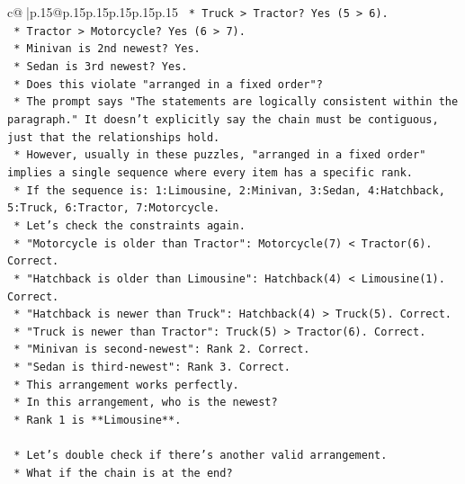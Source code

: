 \documentclass{article}
\begin{document}
{\begin{supertabular}{c@{$\;$}|p{.15\linewidth}@{}p{.15\linewidth}p{.15\linewidth}p{.15\linewidth}p{.15\linewidth}p{.15\linewidth}}
{{{\texttt{                *   Truck > Tractor? Yes (5 > 6).} \\
\texttt{                *   Tractor > Motorcycle? Yes (6 > 7).} \\
\texttt{                *   Minivan is 2nd newest? Yes.} \\
\texttt{                *   Sedan is 3rd newest? Yes.} \\
\texttt{            *   Does this violate "arranged in a fixed order"?} \\
\texttt{                *   The prompt says "The statements are logically consistent within the paragraph." It doesn't explicitly say the chain must be contiguous, just that the relationships hold.} \\
\texttt{                *   However, usually in these puzzles, "arranged in a fixed order" implies a single sequence where every item has a specific rank.} \\
\texttt{                *   If the sequence is: 1:Limousine, 2:Minivan, 3:Sedan, 4:Hatchback, 5:Truck, 6:Tractor, 7:Motorcycle.} \\
\texttt{                *   Let's check the constraints again.} \\
\texttt{                    *   "Motorcycle is older than Tractor": Motorcycle(7) < Tractor(6). Correct.} \\
\texttt{                    *   "Hatchback is older than Limousine": Hatchback(4) < Limousine(1). Correct.} \\
\texttt{                    *   "Hatchback is newer than Truck": Hatchback(4) > Truck(5). Correct.} \\
\texttt{                    *   "Truck is newer than Tractor": Truck(5) > Tractor(6). Correct.} \\
\texttt{                    *   "Minivan is second{-}newest": Rank 2. Correct.} \\
\texttt{                    *   "Sedan is third{-}newest": Rank 3. Correct.} \\
\texttt{            *   This arrangement works perfectly.} \\
\texttt{            *   In this arrangement, who is the newest?} \\
\texttt{                *   Rank 1 is **Limousine**.} \\
\\ 
\texttt{    *   Let's double check if there's another valid arrangement.} \\
\texttt{        *   What if the chain is at the end?} \\
}}}
\end{supertabular}}
\end{document}
